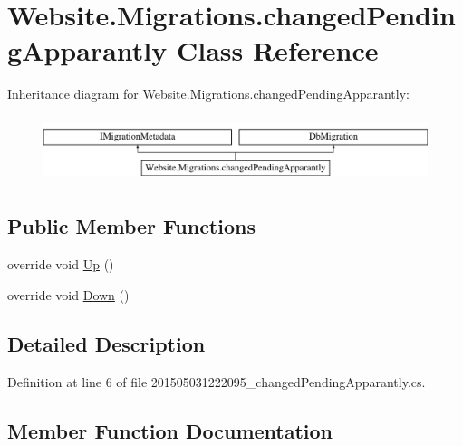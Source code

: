 \hypertarget{class_website_1_1_migrations_1_1changed_pending_apparantly}{}\section{Website.\+Migrations.\+changed\+Pending\+Apparantly Class Reference}
\label{class_website_1_1_migrations_1_1changed_pending_apparantly}
Inheritance diagram for Website.\+Migrations.\+changed\+Pending\+Apparantly\+:\begin{figure}[H]
\begin{center}
\leavevmode
\includegraphics[height=1.944445cm]{class_website_1_1_migrations_1_1changed_pending_apparantly}
\end{center}
\end{figure}
\subsection*{Public Member Functions}
\begin{DoxyCompactItemize}
\item 
override void \hyperlink{class_website_1_1_migrations_1_1changed_pending_apparantly_a8dbf1003f79c331578540c0982959e4a}{Up} ()
\item 
override void \hyperlink{class_website_1_1_migrations_1_1changed_pending_apparantly_ab15eb741cbec50fa1a694d0b51cad00f}{Down} ()
\end{DoxyCompactItemize}


\subsection{Detailed Description}


Definition at line 6 of file 201505031222095\+\_\+changed\+Pending\+Apparantly.\+cs.



\subsection{Member Function Documentation}
\hypertarget{class_website_1_1_migrations_1_1changed_pending_apparantly_ab15eb741cbec50fa1a694d0b51cad00f}{}
